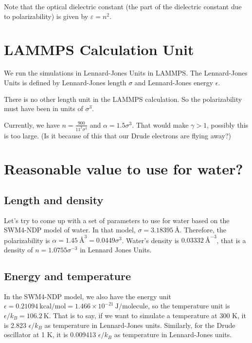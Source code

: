 \documentclass[aps, 12pt, amsmath, amssymb, onecolumn, notitlepage, nofootinbib]{revtex4-1}
\begin{document}
Note that the optical dielectric constant (the part of the dielectric constant due to polarizability) is given by $\varepsilon = n^2$.   


\section{LAMMPS Calculation Unit}

We run the simulations in Lennard-Jones Units in LAMMPS. The Lennard-Jones Units is defined by Lennard-Jones length $\sigma$ and Lennard-Jones energy $\epsilon$.

There is no other length unit in the LAMMPS calculation. So the polarizability must have been in units of $\sigma^3$. 

Currently, we have $n = \frac{900}{11^3 \sigma^3}$ and $\alpha = 1.5 \sigma^3$. That would make $\gamma>1$, possibly this is too large. (Is it because of this that our Drude electrons are flying away?)


\section{Reasonable value to use for water?}

\subsection{Length and density}

Let's try to come up with a set of parameters to use for water based on the SWM4-NDP model of water. In that model, $\sigma = 3.18395\ \text{\AA}$. Therefore, the polarizability is $\alpha = 1.45\ \text{\AA}^3 = 0.0449 \sigma^3$. Water's density is $0.03332\ \text{\AA}^{-3}$, that is a density of $n = 1.0755 \sigma^{-3}$ in Lennard Jones Units.


\subsection{Energy and temperature}

In the SWM4-NDP model, we also have the energy unit $\epsilon = 0.21094\ \text{kcal/mol} = 1.466 \times 10^{-21}\ \text{J/molecule}$, so the temperature unit is $\epsilon/k_B = 106.2\ \text{K}$. That is to say, if we want to simulate a temperature at 300 K, it is 2.823 $\epsilon/k_B$ as temperature in Lennard-Jones units. Similarly, for the Drude oscillator at 1 K, it is 0.009413  $\epsilon/k_B$ as temperature in Lennard-Jones units.
 
\end{document}
